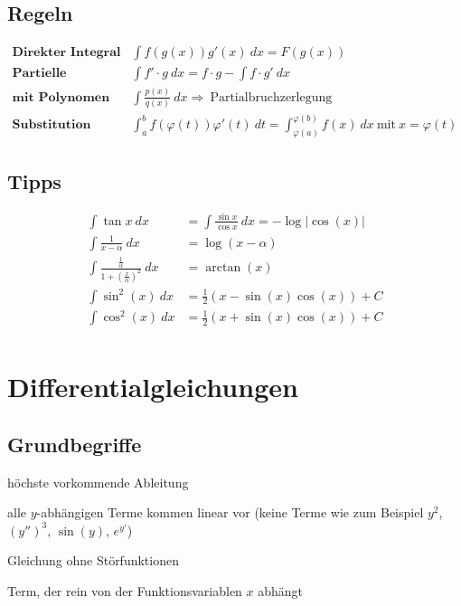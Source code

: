 \documentclass[11pt]{article}
\begin{document}
\subsection{Regeln}

\begin{equation*}
\begin{split}
	\textbf{Direkter Integral}\quad & \int f(g(x))g'(x)\ dx = F(g(x)) \\
	\textbf{Partielle Integration}\quad & \int f' \cdot g\ dx = f \cdot g - \int f \cdot g'\ dx \\
	\textbf{mit Polynomen}\quad & \int\frac{p(x)}{q(x)}\ dx \Rightarrow\ \text{Partialbruchzerlegung} \\
	\textbf{Substitution}\quad & \int_a^b f(\varphi(t))\varphi'(t)\ dt = \int_{\varphi(a)}^{\varphi(b)} f(x)\ dx\ \text{mit}\ x = \varphi(t)
\end{split}
\end{equation*}

\subsection{Tipps}

\begin{equation*}
\begin{split}
	\int\tan x\ dx & = \int\frac{\sin x}{\cos x}\ dx = -\log|\cos(x)| \\
	\int \frac{1}{x - \alpha}\ dx & = \log(x-\alpha) \\
	\int\frac{\frac{1}{\alpha}}{1+(\frac{x}{\alpha})^2}\ dx & = \arctan(x) \\
	\int \sin^2(x)\ dx & = \frac{1}{2}(x - \sin(x)\cos(x)) + C \\
	\int \cos^2(x)\ dx & = \frac{1}{2}(x + \sin(x)\cos(x)) + C \\
\end{split}
\end{equation*}

\section{Differentialgleichungen}

\subsection{Grundbegriffe}

\begin{description}[labelindent=16pt,style=multiline,leftmargin=3.5cm, noitemsep]
	\item[Ordnung:] h{\"o}chste vorkommende Ableitung
	\item[linear:] alle $y$-abh{\"a}ngigen Terme kommen linear vor (keine Terme wie zum Beispiel $y^2$, $(y'')^3$, $\sin(y)$, $e^{y'}$)
	\item[homogen:] Gleichung ohne St{\"o}rfunktionen
	\item[St{\"o}rfunktion:] Term, der rein von der Funktionsvariablen $x$ abh{\"a}ngt
\end{description}
\end{document}
